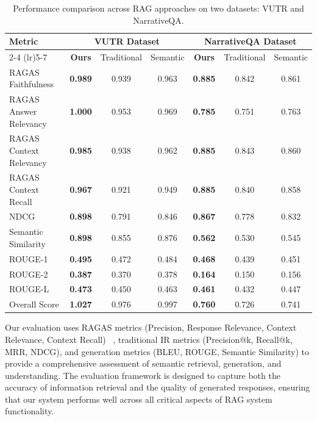 \documentclass[10pt,twocolumn,letterpaper]{article}
\begin{document}
\begin{table}[!ht]
\caption{Performance comparison across RAG approaches on two datasets: VUTR and NarrativeQA.}
\centering
\renewcommand{\arraystretch}{1.1}
\setlength{\tabcolsep}{8pt}
\begin{tabular}{lccc ccc}
\toprule
\textbf{Metric} & \multicolumn{3}{c}{\textbf{VUTR Dataset}} & \multicolumn{3}{c}{\textbf{NarrativeQA Dataset}} \\
\cmidrule(lr){2-4} \cmidrule(lr){5-7}
& \textbf{Ours} & Traditional & Semantic & \textbf{Ours} & Traditional & Semantic \\
\midrule
RAGAS Faithfulness      & \textbf{0.989} & 0.939 & 0.963 & \textbf{0.885} & 0.842 & 0.861 \\
RAGAS Answer Relevancy  & \textbf{1.000} & 0.953 & 0.969 & \textbf{0.785} & 0.751 & 0.763 \\
RAGAS Context Relevancy & \textbf{0.985} & 0.938 & 0.962 & \textbf{0.885} & 0.843 & 0.860 \\
RAGAS Context Recall    & \textbf{0.967} & 0.921 & 0.949 & \textbf{0.885} & 0.840 & 0.858 \\
NDCG                    & \textbf{0.898} & 0.791 & 0.846 & \textbf{0.867} & 0.778 & 0.832 \\
Semantic Similarity     & \textbf{0.898} & 0.855 & 0.876 & \textbf{0.562} & 0.530 & 0.545 \\
ROUGE-1                 & \textbf{0.495} & 0.472 & 0.484 & \textbf{0.468} & 0.439 & 0.451 \\
ROUGE-2                 & \textbf{0.387} & 0.370 & 0.378 & \textbf{0.164} & 0.150 & 0.156 \\
ROUGE-L                 & \textbf{0.473} & 0.450 & 0.463 & \textbf{0.461} & 0.432 & 0.447 \\
Overall Score           & \textbf{1.027} & 0.976 & 0.997 & \textbf{0.760} & 0.726 & 0.741 \\
\bottomrule
\end{tabular}
\label{tab:performance_comparison_combined}
\end{table}

\vspace{0.5em}
Our evaluation uses RAGAS metrics (Precision, Response Relevance, Context Relevance, Context Recall) ~\cite{Es2025Ragas}, traditional IR metrics (Precision@k, Recall@k, MRR, NDCG), and generation metrics (BLEU, ROUGE, Semantic Similarity) to provide a comprehensive assessment of semantic retrieval, generation, and understanding. The evaluation framework is designed to capture both the accuracy of information retrieval and the quality of generated responses, ensuring that our system performs well across all critical aspects of RAG system functionality.
\end{document}
